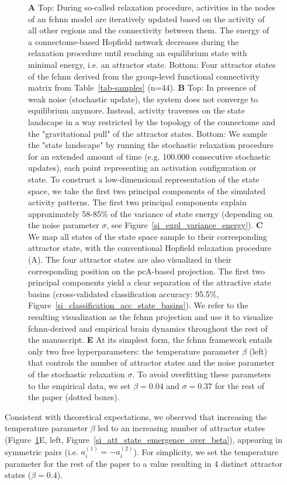 \documentclass{article}
\begin{document}
\begin{figure}[!htbp]
{\textbf{A} Top: During so-called relaxation procedure, activities in the nodes of an \acrshort{fchnn} model are iteratively updated based on the activity of all other regions and the connectivity between them. The energy of a
connectome-based Hopfield network decreases during the relaxation procedure until reaching an equilibrium state with
minimal energy, i.e. an attractor state. Bottom: Four attractor states of the \acrshort{fchnn} derived from the
group-level functional connectivity matrix from Table~\ref{tab-samples} (n=44).
\textbf{B} Top: In presence of weak noise (stochastic update), the system
does not converge to equilibrium anymore. Instead, activity traverses on the state landscape in a way
restricted by the topology of the connectome and the "gravitational pull" of the attractor states. Bottom: We sample
the "state landscape" by running the stochastic relaxation procedure for an extended amount of time (e.g. 100.000 consecutive
stochastic updates), each point representing an activation configuration or state. To construct a
low-dimensional representation of the state space, we take the first two principal components of the simulated activity
patterns. The first two principal components explain approximately 58-85\% of the variance of state energy (depending
on the noise parameter $\sigma$, see Figure~\ref{si_expl_variance_energy}).
\textbf{C} We map all states of the state space sample to their corresponding attractor state, with the conventional
Hopfield relaxation procedure (A). The four attractor states are also visualized in their corresponding position on the
\acrshort{pc}A-based projection. The first two principal components yield a clear separation of the attractive state basins
(cross-validated classification accuracy: 95.5\%, Figure~\ref{si_classification_acc_state_basins}). We refer to the resulting visualization
as the \acrshort{fchnn} projection and use it to visualize \acrshort{fchnn}-derived and empirical brain dynamics throughout the rest of
the manuscript.
\textbf{E} At its simplest form, the \acrshort{fchnn} framework entails only two free hyperparameters: the temperature parameter
$\beta$ (left) that controls the number of attractor states and the noise parameter of the stochastic relaxation
$\sigma$. To avoid overfitting these parameters to the empirical data, we set $\beta=0.04$ and $\sigma=0.37$ for the
rest of the paper (dotted boxes).}
\label{attractors}
\end{figure}

Consistent with theoretical expectations, we observed that increasing the temperature parameter $\beta$ led to an
increasing number of attractor states (Figure~\ref{attractors}E, left, Figure~\ref{si_att_state_emergence_over_beta}), appearing in symmetric pairs
(i.e. $a_i^{(1)} = -a_i^{(2)}$). For simplicity, we set the temperature parameter for the rest of the paper to a value
resulting in 4 distinct attractor states ($\beta=0.4$).
\end{document}
